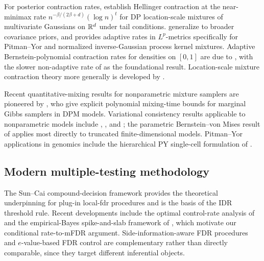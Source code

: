 For posterior contraction rates, \citet{ShenTokdarGhosal2013} establish Hellinger contraction at the near-minimax rate $n^{-\beta/(2\beta+d)}(\log n)^t$ for DP location-scale mixtures of multivariate Gaussians on $\mathbb{R}^d$ under tail conditions. \citet{CanaleDeBlasi2017} generalize to broader covariance priors, and \citet{Scricciolo2014BAPY} provides adaptive rates in $L^p$-metrics specifically for Pitman--Yor and normalized inverse-Gaussian process kernel mixtures. Adaptive Bernstein-polynomial contraction rates for densities on $[0,1]$ are due to \citet{Rousseau2010BetaMix}, with the slower non-adaptive rate of \citet{Ghosal2001Bernstein} as the foundational result. Location-scale mixture contraction theory more generally is developed by \citet{KruijerRousseauVdV2010}.

Recent quantitative-mixing results for nonparametric mixture samplers are pioneered by \citet{Ascolani2024Mixing}, who give explicit polynomial mixing-time bounds for marginal Gibbs samplers in DPM models. Variational consistency results applicable to nonparametric models include \citet{AlquierRidgway2020}, \citet{YangPatiBhattacharya2020}, and \citet{ZhangGao2020}; the parametric Bernstein--von Mises result of \citet{WangBlei2019} applies most directly to truncated finite-dimensional models. Pitman--Yor applications in genomics include the hierarchical PY single-cell formulation of \citet{Bystrova2022HPY}.

\subsection{Modern multiple-testing methodology}

The Sun--Cai compound-decision framework \citep{SunCai2007,CaiSunWang2019} provides the theoretical underpinning for plug-in local-fdr procedures and is the basis of the IDR threshold rule. Recent developments include the optimal control-rate analysis of \citet{HellerRosset2021} and the empirical-Bayes spike-and-slab framework of \citet{CastilloRoquain2020}, which motivate our conditional rate-to-mFDR argument. Side-information-aware FDR procedures \citep{LeiFithian2018AdaPT,IgnatiadisHuber2021IHW} and $e$-value-based FDR control \citep{WangRamdas2022} are complementary rather than directly comparable, since they target different inferential objects.
